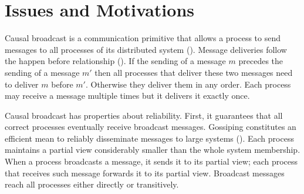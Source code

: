 
\section{Issues and Motivations}
\label{sec:motivations}

Causal broadcast is a communication primitive that allows a process to send
messages to all processes of its distributed system (\REF). Message deliveries
follow the happen before relationship (\REF). If the sending of a message $m$
precedes the sending of a message $m'$ then all processes that deliver these two
messages need to deliver $m$ before $m'$. Otherwise they deliver them in any
order. Each process may receive a message multiple times but it delivers it
exactly once.

Causal broadcast has properties about reliability. First, it guarantees that all
correct processes eventually receive broadcast messages. Gossiping constitutes
an efficient mean to reliably disseminate messages to large systems (\REF). Each
process maintains a partial view considerably smaller than the whole system
membership. When a process broadcasts a message, it sends it to its partial
view; each process that receives such message forwards it to its partial
view. Broadcast messages reach all processes either directly or transitively.

